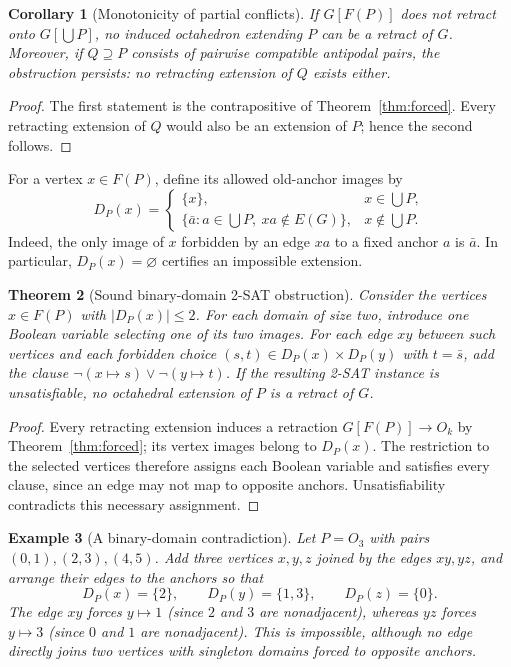 \documentclass[11pt]{article}
\newtheorem{theorem}{Theorem}[section]
\newtheorem{corollary}[theorem]{Corollary}
\newtheorem{example}[theorem]{Example}
\newcommand{\FF}[1]{F(#1)}
\newcommand{\DD}[2]{D_{#1}(#2)}
\begin{document}
\begin{corollary}[Monotonicity of partial conflicts]
\label{cor:monotone}
If \(G[\FF P]\) does not retract onto \(G[\bigcup P]\), no induced
octahedron extending \(P\) can be a retract of \(G\).
Moreover, if \(Q\supseteq P\) consists of pairwise compatible
antipodal pairs, the obstruction persists: no retracting extension
of \(Q\) exists either.
\end{corollary}
\begin{proof}
The first statement is the contrapositive of
Theorem~\ref{thm:forced}. Every retracting extension of \(Q\)
would also be an extension of \(P\); hence the second follows.
\end{proof}

For a vertex \(x\in\FF P\), define its allowed old-anchor images by
\[
\DD P x=\begin{cases}
\{x\},&x\in\bigcup P,\\
\{\bar a:a\in\bigcup P,\ xa\notin E(G)\},&x\notin\bigcup P.
\end{cases}
\]
Indeed, the only image of \(x\) forbidden by an edge \(xa\) to a
fixed anchor \(a\) is \(\bar a\). In particular,
\(\DD P x=\varnothing\) certifies an impossible extension.

\begin{theorem}[Sound binary-domain 2-SAT obstruction]
\label{thm:twosat}
Consider the vertices \(x\in\FF P\) with
\(|\DD P x|\le2\). For each domain of size two, introduce one Boolean
variable selecting one of its two images. For each edge \(xy\) between
such vertices and each forbidden choice
\((s,t)\in\DD P x\times\DD P y\) with \(t=\bar s\), add the clause
\(\neg(x\mapsto s)\lor\neg(y\mapsto t)\).
If the resulting 2-SAT instance is unsatisfiable, no octahedral
extension of \(P\) is a retract of \(G\).
\end{theorem}
\begin{proof}
Every retracting extension induces a retraction
\(G[\FF P]\to O_k\) by Theorem~\ref{thm:forced}; its vertex images
belong to \(\DD P x\). The restriction to the selected vertices
therefore assigns each Boolean variable and satisfies every clause,
since an edge may not map to opposite anchors. Unsatisfiability
contradicts this necessary assignment.
\end{proof}

\begin{example}[A binary-domain contradiction]
Let \(P=O_3\) with pairs \((0,1),(2,3),(4,5)\). Add three vertices
\(x,y,z\) joined by the edges \(xy,yz\), and arrange their edges to
the anchors so that
\[
    \DD P x=\{2\},\qquad \DD P y=\{1,3\},
    \qquad \DD P z=\{0\}.
\]
The edge \(xy\) forces \(y\mapsto1\) (since \(2\) and \(3\)
are nonadjacent), whereas \(yz\) forces \(y\mapsto3\)
(since \(0\) and \(1\) are nonadjacent). This is impossible,
although no edge directly joins two vertices with singleton domains
forced to opposite anchors.
\end{example}
\end{document}
